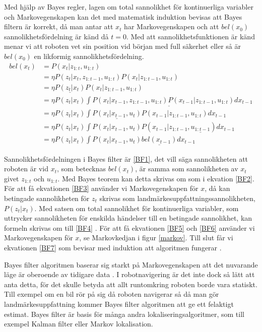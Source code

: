 Med hjälp av Bayes regler, lagen om total sannolikhet för kontinuerliga variabler och Markovegenskapen kan det med matematisk induktion bevisas att Bayes filtern är korrekt, då man antar att $x_t$ har Markovegenskapen och att $bel(x_0)$ sannolikhetsfördelning är känd då $t = 0$. Med att sannolikhetsfunktionen är känd menar vi att roboten vet sin position vid början med full säkerhet eller så är $bel(x_0)$ en likformig sannolikhetsfördelning.
\begin{align}
bel(x_t) & = P(x_t | z_{1:t}, u_{1:t}) \tag{BF1}\label{BF1} \\
        & = \eta P(z_t | x_t, z_{1:t-1}, u_{1:t}) P(x_t | z_{1:t-1}, u_{1:t}) \tag{BF2}\label{BF2}\\
        & = \eta \underline{P(z_t | x_t)} P(x_t | z_{1:t-1}, u_{1:t}) \tag{BF3}\label{BF3}\\
        & = \eta P(z_t | x_t) \underline{\int P(x_t | x_{t-1}, z_{1:t-1}, u_{1:t}) P(x_{t-1} | z_{1:t-1}, u_{1:t}) dx_{t-1}} \tag{BF4}\label{BF4}\\
        & = \eta P(z_t | x_t) \int \underline{P(x_t | x_{t-1}, u_t)} P(x_{t-1} | z_{1:t-1}, u_{1:t}) dx_{t-1} \tag{BF5}\label{BF5}\\
        & = \eta P(z_t | x_t) \int P(x_t | x_{t-1}, u_t) P(x_{t-1} | z_{1:t-1}, \underline{u_{1:t-1}}) dx_{t-1} \tag{BF6}\label{BF6}\\
        & = \eta P(z_t | x_t) \int P(x_t | x_{t-1}, u_t) \underline{bel(x_{t-1})} dx_{t-1} \tag{BF7}\label{BF7}
\end{align}

Sannolikhetsfördelningen i Bayes filter är \ref{BF1}, det vill säga sannolikheten att roboten är vid $x_t$, som betecknas $bel(x_t)$, är samma som sannolikheten av $x_t$ givet $z_{1:t}$ och $u_{1:t}$. Med Bayes teorem kan detta skrivas om som i ekvation \ref{BF2}. För att få ekvationen \ref{BF3} använder vi Markovegenskapen för $x$, då kan betingade sannolikheten för $z_t$ skrivas som landmärkesuppfattningssannolikheten, $P(z_t|x_t)$. Med satsen om total sannolikhet för kontinuerliga variabler, som uttrycker sannolikheten för enskilda händelser till en betingade sannolikhet, kan formeln skrivas om till \ref{BF4} \citep[Kapitel~2.2]{ProbabilisticRobotics}. För att få ekvationen \ref{BF5} och \ref{BF6} använder vi Markovegenskapen för $x$, se Markovkedjan i figur \ref{markov}. Till slut får vi ekvationen \ref{BF7} som bevisar med induktion att algoritmen fungerar \citep{ProbabilisticRobotics}.

Bayes filter algoritmen baserar sig starkt på Markovegenskapen att det nuvarande läge är oberoende av tidigare data \citep{ProbabilisticRobotics}. I robotnavigering är det inte dock så lätt att anta detta, för det skulle betyda att allt runtomkring roboten borde vara statiskt. Till exempel om en bil rör på sig då roboten navigerar så då man gör landmärkesuppfattning kommer Bayes filter algoritmen att ge ett felaktigt estimat. Bayes filter är basis för många andra lokaliseringsalgoritmer, som till exempel Kalman filter eller Markov lokalisation. 

